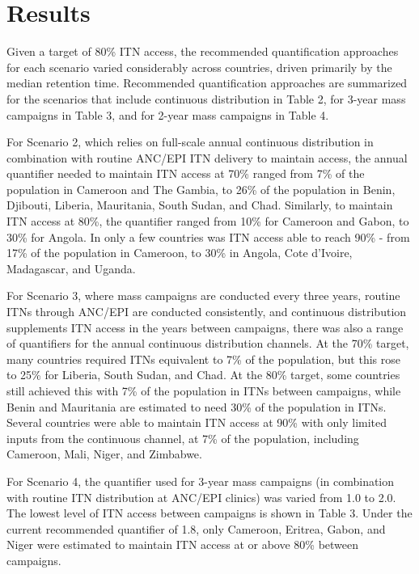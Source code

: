 \documentclass[review,
3p]{elsarticle} %
\begin{document}
\hypertarget{results}{%
\section{Results}\label{results}}

Given a target of 80\% ITN access, the recommended quantification
approaches for each scenario varied considerably across countries,
driven primarily by the median retention time. Recommended
quantification approaches are summarized for the scenarios that include
continuous distribution in Table 2, for 3-year mass campaigns in Table
3, and for 2-year mass campaigns in Table 4.

For Scenario 2, which relies on full-scale annual continuous
distribution in combination with routine ANC/EPI ITN delivery to
maintain access, the annual quantifier needed to maintain ITN access at
70\% ranged from 7\% of the population in Cameroon and The Gambia, to
26\% of the population in Benin, Djibouti, Liberia, Mauritania, South
Sudan, and Chad. Similarly, to maintain ITN access at 80\%, the
quantifier ranged from 10\% for Cameroon and Gabon, to 30\% for Angola.
In only a few countries was ITN access able to reach 90\% - from 17\% of
the population in Cameroon, to 30\% in Angola, Cote d'Ivoire,
Madagascar, and Uganda.

For Scenario 3, where mass campaigns are conducted every three years,
routine ITNs through ANC/EPI are conducted consistently, and continuous
distribution supplements ITN access in the years between campaigns,
there was also a range of quantifiers for the annual continuous
distribution channels. At the 70\% target, many countries required ITNs
equivalent to 7\% of the population, but this rose to 25\% for Liberia,
South Sudan, and Chad. At the 80\% target, some countries still achieved
this with 7\% of the population in ITNs between campaigns, while Benin
and Mauritania are estimated to need 30\% of the population in ITNs.
Several countries were able to maintain ITN access at 90\% with only
limited inputs from the continuous channel, at 7\% of the population,
including Cameroon, Mali, Niger, and Zimbabwe.

For Scenario 4, the quantifier used for 3-year mass campaigns (in
combination with routine ITN distribution at ANC/EPI clinics) was varied
from 1.0 to 2.0. The lowest level of ITN access between campaigns is
shown in Table 3. Under the current recommended quantifier of 1.8, only
Cameroon, Eritrea, Gabon, and Niger were estimated to maintain ITN
access at or above 80\% between campaigns.
\end{document}
